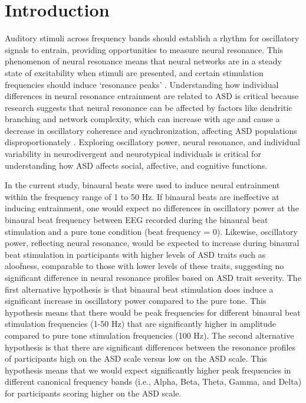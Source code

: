 \section{Introduction}
\par Auditory stimuli across frequency bands should establish a rhythm for oscillatory signals to entrain, providing opportunities to measure neural resonance. This phenomenon of neural resonance means that neural networks are in a steady state of excitability when stimuli are presented, and certain stimulation frequencies should induce ‘resonance peaks’ \citep{calderone2014entrainment}. Understanding how individual differences in neural resonance entrainment are related to ASD is critical because research suggests that neural resonance can be affected by factors like dendritic branching and network complexity, which can increase with age and cause a decrease in oscillatory coherence and synchronization, affecting ASD populations disproportionately \citep{laudanski2014spatially, martorell2019multi}. Exploring oscillatory power, neural resonance, and individual variability in neurodivergent and neurotypical individuals is critical for understanding how ASD affects social, affective, and cognitive functions. 
\par In the current study, binaural beats were used to induce neural entrainment within the frequency range of 1 to 50 Hz. If binaural beats are ineffective at inducing entrainment, one would expect no differences in oscillatory power at the binaural beat frequency between EEG recorded during the binaural beat stimulation and a pure tone condition (beat frequency = 0). Likewise, oscillatory power, reflecting neural resonance, would be expected to increase during binaural beat stimulation in participants with higher levels of ASD traits such as aloofness, comparable to those with lower levels of these traits, suggesting no significant difference in neural resonance profiles based on ASD trait severity. The first alternative hypothesis is that binaural beat stimulation does induce a significant increase in oscillatory power compared to the pure tone. This hypothesis means that there would be peak frequencies for different binaural beat stimulation frequencies (1-50 Hz) that are significantly higher in amplitude compared to pure tone stimulation frequencies (100 Hz). The second alternative hypothesis is that there are significant differences between the resonance profiles of participants high on the ASD scale versus low on the ASD scale. This hypothesis means that we would expect significantly higher peak frequencies in different canonical frequency bands (i.e., Alpha, Beta, Theta, Gamma, and Delta) for participants scoring higher on the ASD scale. 
